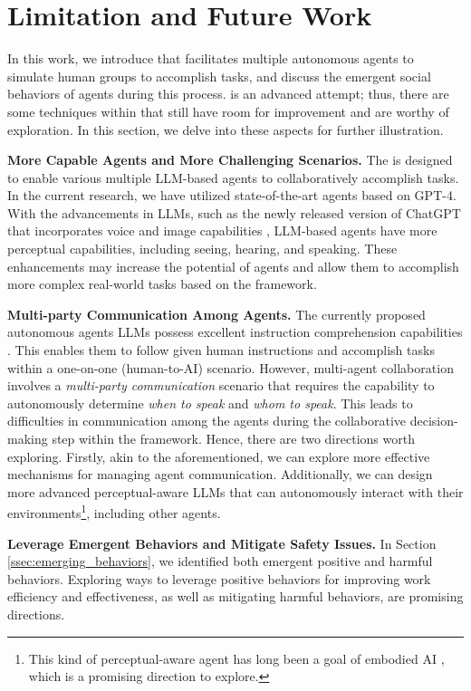 \section{Limitation and Future Work}
\label{sec:limitation_and_future_work}




In this work, we introduce \framework that facilitates multiple autonomous agents to simulate human groups to accomplish tasks, and discuss the emergent social behaviors of agents during this process. \framework is an advanced attempt; thus, there are some techniques within \framework that still have room for improvement and are worthy of exploration. In this section, we delve into these aspects for further illustration.


\textbf{More Capable Agents and More Challenging Scenarios.}
The \framework is designed to enable various multiple LLM-based agents to collaboratively accomplish tasks. In the current research, we have utilized state-of-the-art agents based on GPT-4. With the advancements in LLMs, such as the newly released version of ChatGPT that incorporates voice and image capabilities \citep{OpenAI_ChatGPT}, LLM-based agents have more perceptual capabilities, including seeing, hearing, and speaking. These enhancements may increase the potential of agents and allow them to accomplish more complex real-world tasks based on the \framework framework.

\textbf{Multi-party Communication Among Agents.}
The currently proposed autonomous agents \citep{richards2023auto, nakajima2023babyagi, agentgpt, DBLP:journals/corr/abs-2305-16291} LLMs possess excellent instruction comprehension capabilities \citep{wei2022finetuned,NEURIPS2020_1f89885d}. This enables them to follow given human instructions and accomplish tasks within a one-on-one (human-to-AI) scenario. However, multi-agent collaboration involves a \textit{multi-party communication} \citep{wei2023multiparty} scenario that requires the capability to autonomously determine \textit{when to speak} and \textit{whom to speak}. This leads to difficulties in communication among the agents during the collaborative decision-making step within the \framework framework. Hence, there are two directions worth exploring. Firstly, akin to the aforementioned, we can explore more effective mechanisms for managing agent communication. Additionally, we can design more advanced perceptual-aware LLMs \citep{OpenAI_ChatGPT} that can autonomously interact with their environments\footnote{This kind of perceptual-aware agent has long been a goal of embodied AI \citep{ahn2022i,DBLP:conf/icml/DriessXSLCIWTVY23}, which is a promising direction to explore.}, including other agents.


\textbf{Leverage Emergent Behaviors and Mitigate Safety Issues.}
In Section \ref{ssec:emerging_behaviors}, we identified both emergent positive and harmful behaviors. Exploring ways to leverage positive behaviors for improving work efficiency and effectiveness, as well as mitigating harmful behaviors, are promising directions.
